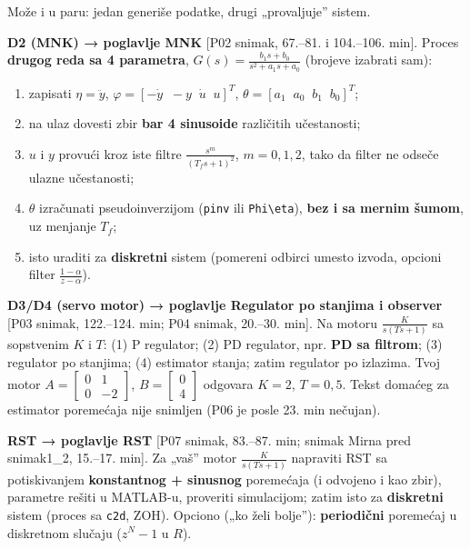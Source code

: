 \documentclass[11pt,a4paper,parskip=half,headsepline,numbers=noenddot]{scrartcl}
\DeclareRobustCommand{\izvor}[1]{{\small\color{izvorC}[#1]}}
\begin{document}
Može i u paru: jedan generiše podatke, drugi „provaljuje'' sistem.

\textbf{D2 (MNK) → poglavlje MNK} \izvor{P02 snimak, 67.--81. i 104.--106. min}. Proces \textbf{drugog reda sa 4 parametra}, \(G(s) = \frac{b_1s + b_0}{s^2 + a_1s + a_0}\) (brojeve izabrati sam):

\begin{enumerate}
\def\labelenumi{\arabic{enumi}.}
\item zapisati \(\eta = \ddot y\), \(\varphi = [-\dot y\;\; -y\;\; \dot u\;\; u]^T\), \(\theta = [a_1\;\; a_0\;\; b_1\;\; b_0]^T\);
\item na ulaz dovesti zbir \textbf{bar 4 sinusoide} različitih učestanosti;
\item \(u\) i \(y\) provući kroz iste filtre \(\frac{s^m}{(T_fs+1)^2}\), \(m = 0, 1, 2\), tako da filter ne odseče ulazne učestanosti;
\item \(\theta\) izračunati pseudoinverzijom (\texttt{pinv} ili \texttt{Phi\textbackslash{}eta}), \textbf{bez i sa mernim šumom}, uz menjanje \(T_f\);
\item isto uraditi za \textbf{diskretni} sistem (pomereni odbirci umesto izvoda, opcioni filter \(\frac{1-\alpha}{z-\alpha}\)).
\end{enumerate}

\textbf{D3/D4 (servo motor) → poglavlje Regulator po stanjima i observer} \izvor{P03 snimak, 122.--124. min; P04 snimak, 20.--30. min}. Na motoru \(\frac{K}{s(Ts+1)}\) sa sopstvenim \(K\) i \(T\): (1) P regulator; (2) PD regulator, npr. \textbf{PD sa filtrom}; (3) regulator po stanjima; (4) estimator stanja; zatim regulator po izlazima. Tvoj motor \(A = \begin{bmatrix}0 & 1\\ 0 & -2\end{bmatrix}\), \(B = \begin{bmatrix}0\\ 4\end{bmatrix}\) odgovara \(K = 2\), \(T = 0{,}5\). Tekst domaćeg za estimator poremećaja nije snimljen (P06 je posle 23. min nečujan).

\textbf{RST → poglavlje RST} {[}P07 snimak, 83.--87. min; snimak Mirna pred snimak1\_2, 15.--17. min{]}. Za „vaš'' motor \(\frac{K}{s(Ts+1)}\) napraviti RST sa potiskivanjem \textbf{konstantnog + sinusnog} poremećaja (i odvojeno i kao zbir), parametre rešiti u MATLAB-u, proveriti simulacijom; zatim isto za \textbf{diskretni} sistem (proces sa \texttt{c2d}, ZOH). Opciono („ko želi bolje''): \textbf{periodični} poremećaj u diskretnom slučaju (\(z^N - 1\) u \(R\)).
\end{document}
